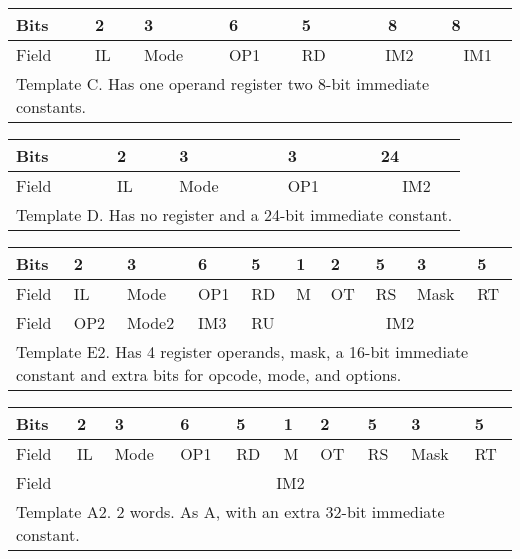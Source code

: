 \documentclass[forwardcom.tex]{subfiles}
\begin{document}
\begin{longtable}[l]{|p{8mm}|p{8mm}|p{8mm}|p{8mm}|p{8mm}|p{8mm}p{8mm}p{8mm}|p{8mm}p{8mm}|}
\endfirsthead
\label{table:templateC}
\endhead
\hline
 Bits & 2 & 3 & 6 & 5 & & \hspace{2mm} 8 & & \multicolumn{2}{|p{20mm}|}{ \hspace{8mm} 8 } \\
\hline
Field & IL & Mode & OP1 & RD & 
\multicolumn{3}{|c|}{ IM2 } & \multicolumn{2}{|c|}{ IM1 } \\
\hline
\multicolumn{10}{|l|}{
Template C. Has one operand register two 8-bit immediate constants.} \\
\hline
\end{longtable}

\begin{longtable}[l]{|p{8mm}|p{8mm}|p{8mm}|p{8mm}|p{40mm}|}
\endfirsthead
\label{table:templateD}
\endhead
\hline
 Bits & 2 & 3 & 3 & 
\multicolumn{1}{|p{69mm}|}{ \hspace{31mm} 24 } \\
\hline
Field & IL & Mode & OP1 & 
\multicolumn{1}{|c|}{ IM2 } \\
\hline
\multicolumn{5}{|l|}{
Template D. Has no register and a 24-bit immediate constant.} \\
\hline
\end{longtable}

\begin{longtable}[l]{|p{8mm}|p{8mm}|p{8mm}|p{8mm}|p{8mm}|p{8mm}|p{8mm}|p{8mm}|p{8mm}|p{8mm}|}
\endfirsthead
\label{table:templateE2}
\endhead
\hline
 Bits & 2 & 3 & 6 & 5 & 1 & 2 & 5 & 3 & 5 \\
\hline
Field & IL & Mode & OP1 & RD & M & OT & RS & Mask & RT \\
\hline
Field & OP2 & \small Mode2 & IM3 & RU & \multicolumn{5}{|c|}{ IM2 } \\
\hline
\multicolumn{10}{|p{108mm}|}{
Template E2. Has 4 register operands, mask, a 16-bit immediate constant and extra bits for
opcode, mode, and options.} \\
\hline
\end{longtable}


\pagebreak
\begin{longtable}[l]{|p{8mm}|p{8mm}|p{8mm}|p{8mm}|p{8mm}|p{8mm}|p{8mm}|p{8mm}|p{8mm}|p{8mm}|}
\endfirsthead
\label{table:templateA2}
\endhead
\hline
 Bits & 2 & 3 & 6 & 5 & 1 & 2 & 5 & 3 & 5 \\
\hline
Field & IL & Mode & OP1 & RD & M & OT & RS & Mask & RT \\
\hline
Field & \multicolumn{9}{|c|}{ IM2 } \\
\hline
\multicolumn{10}{|l|}{
Template A2. 2 words. As A, with an extra 32-bit immediate constant.} \\
\hline
\end{longtable}
\end{document}
